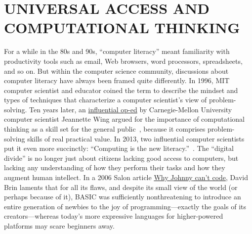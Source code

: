 
\section{UNIVERSAL ACCESS AND COMPUTATIONAL THINKING}




For a while in the 80s and 90s, ``computer literacy'' meant familiarity
with productivity tools such as email, Web browsers, word processors,
spreadsheets, and so on.
But within the computer science community, discussions about computer
literacy have always been framed quite differently.
In 1996, MIT computer scientist and educator  coined
the term  to describe the mindset and types of
techniques that characterize a computer scientist's view of
problem-solving.
Ten years later, an
\href{http://www.cs.cmu.edu/afs/cs/usr/wing/www/publications/Wing06.pdf}{influential
op-ed} by Carnegie-Mellon University computer scientist Jeannette Wing
argued for the importance of computational thinking as a skill set for
the general public~\cite{wing_computational_thinking}, because it
comprises problem-solving skills of real practical value.
In 2013, two influential computer scientists put it even more
succinctly: ``Computing is the new
literacy.''~\cite{ieee_computer_special_issue_computing_education}.
The ``digital divide'' is no longer just about citizens lacking good
access to computers, but lacking any understanding of how they perform
their tasks and how they augment human intellect.
In a 2006 Salon article \href{www.salon.com/2006/09/14/basic_2}{Why
Johnny can't code}, David Brin laments that for all its flaws, and
despite its small view of the world (or perhaps because of it), BASIC
was sufficiently nonthreatening to introduce an entire generation of
newbies to the joy of programming---exactly the goals of its
creators---whereas today's more expressive languages for higher-powered
platforms may scare beginners away.

